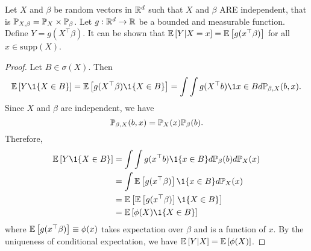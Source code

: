 \begin{exercise}
    Let $X$ and $\beta$ be random vectors in $\mathbb{R}^d$ such that $X$ and $\beta$ ARE independent, that is $\mathbb{P}_{X,\beta}=\mathbb{P}_X \times \mathbb{P}_\beta$. Let $g:\mathbb{R}^d\to\mathbb{R}$ be a bounded and measurable function. Define $Y=g(X^\top\beta)$. It can be shown that $\mathbb{E}\left[Y|X=x\right]=\mathbb{E}\left[g(x^\top\beta)\right]$ for all $x\in \text{supp}(X)$.
\end{exercise}
\begin{proof}
    Let $B\in \sigma(X)$. Then $$\E\bra{Y\1\{X\in B\}}=\E\bra{g(X^\top\beta)\1\{X\in B\}}=\int\int g(X^\top b)\1{x\in B}d\p_{\beta,X}(b,x).$$
    Since $X$ and $\beta$ are independent, we have $$\mathbb{P}_{\beta,X}(b,x)=\mathbb{P}_X(x)\mathbb{P}_\beta(b).$$
    Therefore, \begin{equation*}
        \begin{split}
            \E\bra{Y\1\{X\in B\}} & =\int\int g(x^\top b)\1\{x\in B\}d\p_{\beta}(b)d\p_X(x) \\&=\int \E\bra{g(x^\top \beta)}\1\{x\in B\}d\p_X(x)\\
                                  & =\E\bra{\E\bra{g(x^\top \beta)}\1\{X\in B\}}            \\
                                  & =\E\bra{\phi(X)\1\{X\in B\}}
        \end{split}
    \end{equation*}
    where $ \mathbb{E}\left[g(x^\top \beta)\right]\equiv \phi(x)$ takes expectation over $\beta$ and is a function of $x$.
    By the uniqueness of conditional expectation, we have $\mathbb{E}\left[Y|X\right]=\mathbb{E}\left[\phi(X)\right]$.
\end{proof}
